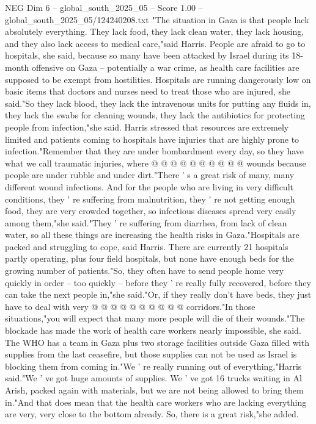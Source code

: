 \begin{textsample}{NEG Dim 6 – global\_south\_2025\_05 – Score 1.00 – global\_south\_2025\_05/124240208.txt}  \label{ex:f6_neg_422}
"The situation in Gaza is that people lack absolutely everything.
They lack food, they lack clean water, they lack housing, and they also lack access to medical care,"said Harris.
People are afraid to go to hospitals, she said, because so many have been attacked by Israel during its 18-month offensive on Gaza -- potentially a war crime, as health care facilities are supposed to be exempt from hostilities.
Hospitals are running dangerously low on basic items that doctors and nurses need to treat those who are injured, she said."So they lack blood, they lack the intravenous units for putting any fluids in, they lack the swabs for cleaning wounds, they lack the antibiotics for protecting people from infection,"she said.
Harris stressed that resources are extremely limited and patients coming to hospitals have injuries that are highly prone to infection."Remember that they are under bombardment every day, so they have what we call traumatic injuries, where @ @ @ @ @ @ @ @ @ @ wounds because people are under rubble and under dirt."There ' s a great risk of many, many different wound infections.
And for the people who are living in very difficult conditions, they ' re suffering from malnutrition, they ' re not getting enough food, they are very crowded together, so infectious diseases spread very easily among them,"she said."They ' re suffering from diarrhea, from lack of clean water, so all these things are increasing the health risks in Gaza."Hospitals are packed and struggling to cope, said Harris.
There are currently 21 hospitals partly operating, plus four field hospitals, but none have enough beds for the growing number of patients."So, they often have to send people home very quickly in order -- too quickly -- before they ' re really fully recovered, before they can take the next people in,"she said."Or, if they really don't have beds, they just have to deal with very @ @ @ @ @ @ @ @ @ @ corridors."In those situations,"you will expect that many more people will die of their wounds."The blockade has made the work of health care workers nearly impossible, she said.
The WHO has a team in Gaza plus two storage facilities outside Gaza filled with supplies from the last ceasefire, but those supplies can not be used as Israel is blocking them from coming in."We ' re really running out of everything,"Harris said."We ' ve got huge amounts of supplies.
We ' ve got 16 trucks waiting in Al Arish, packed again with materials, but we are not being allowed to bring them in."And that does mean that the health care workers who are lacking everything are very, very close to the bottom already.
So, there is a great risk,"she added.

\end{textsample}
